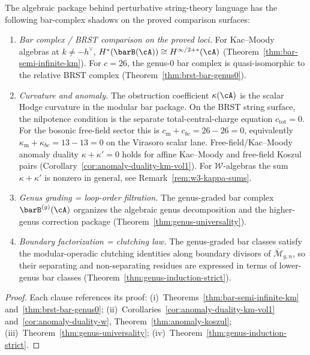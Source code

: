 \begin{theorem}\label{thm:algebraic-string-dictionary}
The algebraic package behind
perturbative string-theory language has the following bar-complex
shadows on the proved comparison surfaces:
\begin{enumerate}[label=\textup{(\roman*)}]
\item \emph{Bar complex / BRST comparison on the proved loci.}
 For Kac--Moody algebras at $k \neq -h^\vee$,
 $H^*(\barB(\cA)) \cong H^{\infty/2+*}(\cA)$
 \textup{(}Theorem~\textup{\ref{thm:bar-semi-infinite-km})}.
 For $c = 26$, the genus-$0$ bar complex is
 quasi-isomorphic to the relative BRST complex
 \textup{(}Theorem~\textup{\ref{thm:brst-bar-genus0})}.
\item \emph{Curvature and anomaly.}
 The obstruction coefficient $\kappa(\cA)$ is the scalar Hodge
 curvature in the modular bar package. On the BRST string surface, the
 nilpotence condition is the separate total-central-charge equation
 $c_{\mathrm{tot}}=0$. For the bosonic free-field sector this is
 $c_{\mathrm m}+c_{bc}=26-26=0$, equivalently
 $\kappa_{\mathrm m}+\kappa_{bc}=13-13=0$ on the Virasoro scalar lane.
	 Free-field/Kac--Moody anomaly duality
	 $\kappa + \kappa' = 0$ holds for affine Kac--Moody and free-field
	 Koszul pairs
	 \textup{(}Corollary~\textup{\ref{cor:anomaly-duality-km-vol1}}\textup{)}.
	 For $\mathcal{W}$-algebras the sum $\kappa + \kappa'$ is
	 nonzero in general, see Remark~\textup{\ref{rem:w3-kappa-sums}}.
\item \emph{Genus grading = loop-order filtration.}
 The genus-graded bar complex
 $\barB^{(g)}(\cA)$ organizes the algebraic genus decomposition and
 the higher-genus correction package
 \textup{(}Theorem~\textup{\ref{thm:genus-universality})}.
\item \emph{Boundary factorization = clutching law.}
 The genus-graded bar classes satisfy the modular-operadic clutching
 identities along boundary divisors of
 $\overline{\mathcal{M}}_{g,n}$, so their separating and
 non-separating residues are expressed in terms of lower-genus bar
 classes
 \textup{(}Theorem~\textup{\ref{thm:genus-induction-strict})}.
\end{enumerate}
\end{theorem}

\begin{proof}
Each clause references its proof:
(i)~Theorems~\ref{thm:bar-semi-infinite-km}
and~\ref{thm:brst-bar-genus0};
(ii)~Corollaries~\ref{cor:anomaly-duality-km-vol1}
and~\ref{cor:anomaly-duality-w},
Theorem~\ref{thm:anomaly-koszul};
(iii)~Theorem~\ref{thm:genus-universality};
(iv)~Theorem~\ref{thm:genus-induction-strict}.
\end{proof}

